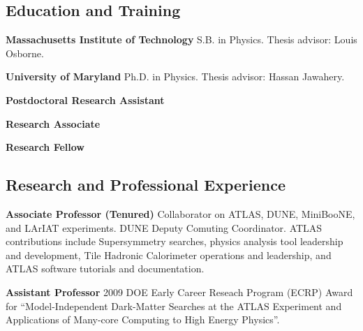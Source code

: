 \subsection*{Education and Training}
\par{\sc \bf{Massachusetts Institute of Technology}}
S.B. in Physics. Thesis advisor: Louis Osborne.

\par{\sc \bf{ University of Maryland}}
Ph.D. in Physics. Thesis advisor: Hassan Jawahery.\\

\par{\sc \bf{Postdoctoral Research Assistant}} 

\par{\sc \bf{Research Associate}}   

\par{\sc \bf{Research Fellow}}
 


\subsection*{Research and Professional Experience}
\par{\sc \bf{Associate Professor (Tenured)}}  
Collaborator on ATLAS, DUNE, MiniBooNE, and LArIAT experiments. DUNE
Deputy Comuting Coordinator. ATLAS contributions include Supersymmetry searches, physics analysis tool leadership
 and development, Tile Hadronic Calorimeter operations and leadership,
 and ATLAS software tutorials and documentation.  

 \par{\sc \bf{Assistant Professor}}  
2009 DOE Early Career Reseach Program (ECRP) Award for
``Model-Independent Dark-Matter Searches at the ATLAS Experiment and
Applications of Many-core Computing to High Energy Physics''. 


